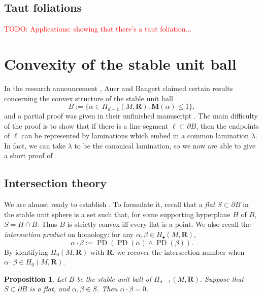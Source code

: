 \documentclass[reqno,11pt]{amsart}
\newcommand{\RR}{\mathbf{R}}
\DeclareMathOperator{\PD}{PD}
\newcommand{\Mass}{\mathbf M}
\newcommand{\dfn}[1]{\emph{#1}\index{#1}}
\newtheorem{proposition}[theorem]{Proposition}
\theoremstyle{definition}
\numberwithin{equation}{section}
\newcommand\todo[1]{\textcolor{red}{TODO: #1}}
\begin{document}

\subsection{Taut foliations}
\todo{Applications: showing that there's a taut foliation...}


\section{Convexity of the stable unit ball}\label{convexity sec}
In the research announcement \cite{Auer01}, Auer and Bangert claimed certain results concerning the convex structure of the stable unit ball
$$B := \{\alpha \in H_{d - 1}(M, \RR): \Mass(\alpha) \leq 1\},$$
and a partial proof was given in their unfinished manuscript \cite{Auer12}.
The main difficulty of the proof is to show that if there is a line segment $\ell \subset \partial B$, then the endpoints of $\ell$ can be represented by laminations which embed in a common lamination $\lambda$.
In fact, we can take $\lambda$ to be the canonical lamination, so we now are able to give a short proof of \cite[Theorems 6 and 7]{Auer01}.

\subsection{Intersection theory}
We are almost ready to establish \cite[Theorem 6]{Auer01}.
To formulate it, recall that a \dfn{flat} $S \subset \partial B$ in the stable unit sphere is a set such that, for some supporting hyperplane $H$ of $B$, $S = H \cap B$.
Thus $B$ is strictly convex iff every flat is a point.
We also recall the \dfn{intersection product} on homology: for any $\alpha, \beta \in H_\bullet(M, \RR)$,
$$\alpha \cdot \beta := \PD(\PD(\alpha) \wedge \PD(\beta)).$$
By identifying $H_0(M, \RR)$ with $\RR$, we recover the intersection number when $\alpha \cdot \beta \in H_0(M, \RR)$.

\begin{proposition}\label{flats are nonintersecting}
Let $B$ be the stable unit ball of $H_{d - 1}(M, \RR)$.
Suppose that $S \subset \partial B$ is a flat, and $\alpha, \beta \in S$.
Then $\alpha \cdot \beta = 0$.
\end{proposition}
\end{document}

